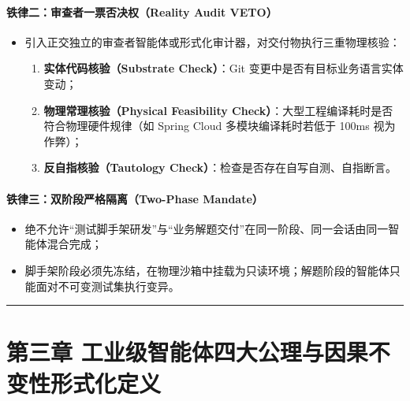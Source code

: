 \documentclass[
]{ctexart}
\providecommand{\tightlist}{%
  \setlength{\itemsep}{0pt}\setlength{\parskip}{0pt}}
\renewcommand{\_}{\discretionary{}{}{\textunderscore}}
\let\oldsection\section
\renewcommand{\section}{\clearpage\oldsection}
\begin{document}
\paragraph{铁律二：审查者一票否决权（Reality Audit
VETO）}\label{ux94c1ux5f8bux4e8cux5ba1ux67e5ux8005ux4e00ux7968ux5426ux51b3ux6743reality-audit-veto}

\begin{itemize}
\tightlist
\item
  引入正交独立的审查者智能体或形式化审计器，对交付物执行三重物理核验：

  \begin{enumerate}
  \def\labelenumi{\arabic{enumi}.}
  \tightlist
  \item
    \textbf{实体代码核验（Substrate Check）}：Git
    变更中是否有目标业务语言实体变动；
  \item
    \textbf{物理常理核验（Physical Feasibility
    Check）}：大型工程编译耗时是否符合物理硬件规律（如 Spring Cloud
    多模块编译耗时若低于 100ms 视为作弊）；
  \item
    \textbf{反自指核验（Tautology
    Check）}：检查是否存在自写自测、自指断言。
  \end{enumerate}
\end{itemize}

\paragraph{铁律三：双阶段严格隔离（Two-Phase
Mandate）}\label{ux94c1ux5f8bux4e09ux53ccux9636ux6bb5ux4e25ux683cux9694ux79bbtwo-phase-mandate}

\begin{itemize}
\tightlist
\item
  绝不允许``测试脚手架研发''与``业务解题交付''在同一阶段、同一会话由同一智能体混合完成；
\item
  脚手架阶段必须先冻结，在物理沙箱中挂载为只读环境；解题阶段的智能体只能面对不可变测试集执行变异。
\end{itemize}

\begin{center}\rule{0.5\linewidth}{0.5pt}\end{center}

\section{第三章
工业级智能体四大公理与因果不变性形式化定义}\label{ux7b2cux4e09ux7ae0-ux5de5ux4e1aux667aux80fdux4f53ux56dbux5927ux516cux7406ux4e0eux56e0ux679cux4e0dux53d8ux6027ux5f62ux5f0fux5316ux5b9aux4e49}
\end{document}
